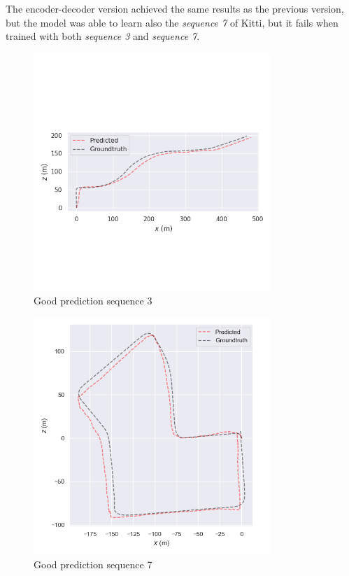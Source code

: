The encoder-decoder version achieved the same results as the previous version, but the model was able to learn also the \textit{sequence 7} of Kitti, but it fails when trained with both \textit{sequence 3} and \textit{sequence 7}.
\begin{figure}[H]
    \centering
    \includegraphics[width=0.8\textwidth]{images/1_4_well_predicted_seq_3}
    \caption{Good prediction sequence 3}\label{fig:well-predicted-seq-3}
\end{figure}
\begin{figure}[H]
    \centering
    \includegraphics[width=0.8\textwidth]{images/1_4_well_predicted_seq_7}
    \caption{Good prediction sequence 7}\label{fig:well-predicted-seq-7}
\end{figure}

